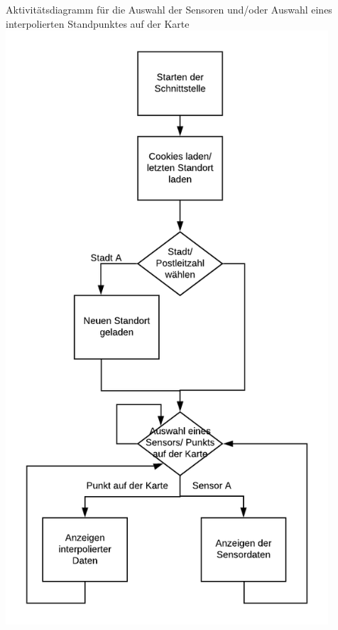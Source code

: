 Aktivitätsdiagramm für die Auswahl der Sensoren und/oder Auswahl eines interpolierten Standpunktes auf der Karte
\includegraphics[width=0.9\textwidth]{media/AuswahlSensoren} 
\newline

